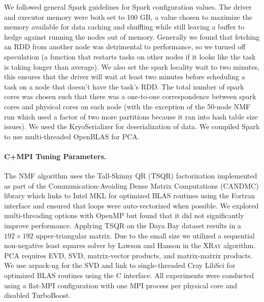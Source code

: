 We followed general Spark guidelines for Spark configuration values. The driver and executor memory were both set to 100 GB, a value chosen to maximize the memory available for data caching and shuffling while still leaving a buffer to hedge against running the nodes out of memory.  Generally we found that fetching an RDD from another node was detrimental to performance, so we turned off speculation (a function that restarts tasks on other nodes if it looks like the task is taking longer than average). We also set the spark locality wait to two minutes, this ensures that the driver will wait at least two minutes before scheduling a task on a node that doesn't have the task's RDD. The total number of spark cores was chosen such that there was a one-to-one correspondence between spark cores and physical cores on each node (with the exception of the 50-node NMF run which used a factor of two more partitions because it ran into hash table size issues). We used the KryoSerializer for deserialization of data. We compiled Spark to use multi-threaded OpenBLAS for PCA.

\paragraph{C+MPI Tuning Parameters.}
The NMF algorithm uses the Tall-Skinny QR (TSQR) \cite{ballard14,demmel12} factorization implemented as part of the Communication-Avoiding Dense Matrix Computations (CANDMC) library \cite{Solomonik14} which links to Intel MKL for optimized BLAS routines using the Fortran interface and ensured that loops were auto-vectorized when possible. We explored multi-threading options with OpenMP but found that it did not significantly improve performance. Applying TSQR on the Daya Bay dataset results in a $192 \times 192$ upper-triangular matrix. Due to the small size we utilized a sequential non-negative least squares solver by Lawson and Hanson \cite{lawson95} in the \textsc{XRay} algorithm. PCA requires EVD, SVD, matrix-vector products, and matrix-matrix products. We use arpack-ng \cite{Lehoucq97} for the SVD and link to single-threaded Cray LibSci for optimized BLAS routines using the C interface. All experiments were conducted using a flat-MPI configuration with one MPI process per physical core and disabled TurboBoost.
